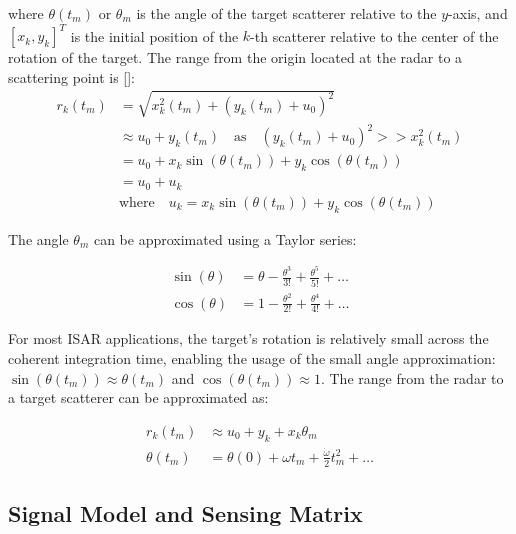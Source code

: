 \noindent where $\theta(t_{m})$ or $\theta_m$ is the angle of the target scatterer relative to the $y$-axis, and $[x_{k}, y_{k}]^{T}$ is the initial position of the $k$-th scatterer relative to the center of the rotation of the target. The range from the origin located at the radar to a scattering point is []:
\begin{equation}
    \begin{aligned}
        r_{k}(t_m) &= \sqrt{x_{k}^2(t_m) + (y_k(t_{m}) + u_{0})^2}\\
        &\approx u_{0} + y_{k}(t_m) \quad \mathrm{as} \quad (y_k(t_{m}) + u_{0})^2 >> x_{k}^2(t_m)\\
        &= u_{0} + x_{k} \sin(\theta(t_{m})) + y_{k}\cos(\theta(t_{m}))\\
        &= u_{0} + u_{k} \\ &\mathrm{where} \quad u_{k} = x_{k} \sin(\theta(t_{m})) + y_{k}\cos(\theta(t_{m}))
    \end{aligned} 
    \label{eq:r}
\end{equation}

\noindent The angle $\theta_m$ can be approximated using a Taylor series:

\begin{equation}
    \begin{aligned}
        \sin(\theta) &= \theta - \frac{\theta^3}{3!} + \frac{\theta^{5}}{5!} + \dots \\
        \cos(\theta) &= 1 - \frac{\theta^2}{2!} + \frac{\theta^{4}}{4!} + \dots
    \end{aligned}
\end{equation}

\noindent For most ISAR applications, the target's rotation is relatively small across the coherent integration time, enabling the usage of the small angle approximation: $\sin(\theta(t_{m})) \approx\theta(t_{m})$ and $\cos(\theta(t_m)) \approx 1$. The range from the radar to a target scatterer can be approximated as:

\begin{equation}
  \begin{aligned}
    r_{k}(t_{m}) &\approx u_{0} + y_{k} + x_{k}\theta_{m} \\ \theta(t_{m}) &= \theta(0) + \omega t_{m} + \frac{\dot{\omega}}{2}t_{m}^{2} + \dots
  \end{aligned}
  \label{eq:r_final}
\end{equation}

\subsection{Signal Model and Sensing Matrix} \label{sec:signal} 

